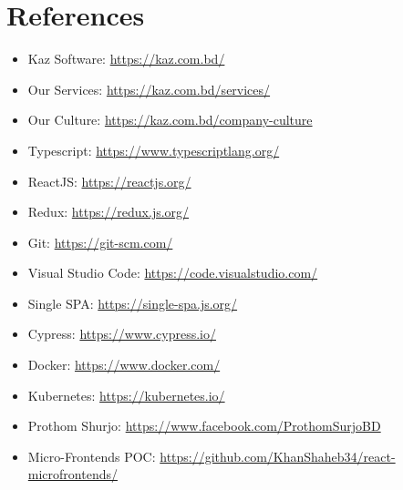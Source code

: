 \chapter{References}

\begin{itemize}
    \item Kaz Software: \url{https://kaz.com.bd/}
    \item Our Services: \url{https://kaz.com.bd/services/}
    \item Our Culture: \url{https://kaz.com.bd/company-culture}
    \item Typescript: \url{https://www.typescriptlang.org/}
    \item ReactJS: \url{https://reactjs.org/}
    \item Redux: \url{https://redux.js.org/}
    \item Git: \url{https://git-scm.com/}
    \item Visual Studio Code: \url{https://code.visualstudio.com/}
    \item Single SPA: \url{https://single-spa.js.org/}
    \item Cypress: \url{https://www.cypress.io/}
    \item Docker: \url{https://www.docker.com/}
    \item Kubernetes: \url{https://kubernetes.io/}
    \item Prothom Shurjo: \url{https://www.facebook.com/ProthomSurjoBD}
    \item Micro-Frontends POC: \url{https://github.com/KhanShaheb34/react-microfrontends/}
\end{itemize}